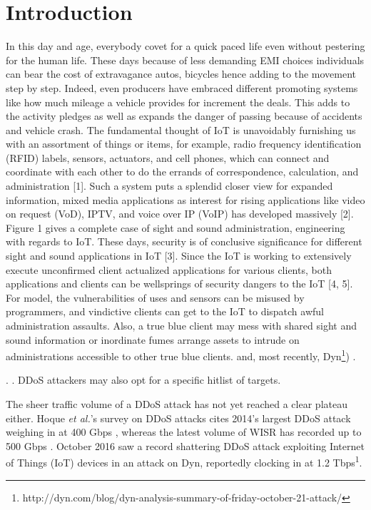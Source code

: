 \documentclass[conference]{IEEEtran}
\begin{document}
\section{Introduction}
In this day and age, everybody covet for a quick paced life even without pestering for the human life. These days because of less demanding EMI choices individuals can bear the cost of extravagance autos, bicycles hence adding to the movement step by step. Indeed, even producers have embraced different promoting systems like how much mileage a vehicle provides for increment the deals. This adds to the activity pledges as well as expands the danger of passing because of accidents and vehicle crash.
The fundamental thought of IoT is unavoidably furnishing us with an assortment of things or items, for example, radio frequency identification (RFID) labels, sensors, actuators, and cell phones, which can connect and coordinate with each other to do the errands of correspondence, calculation, and administration [1]. Such a system puts a splendid closer view for expanded information, mixed media applications as interest for rising applications like video on request (VoD), IPTV, and voice over IP (VoIP) has developed massively [2]. Figure 1 gives a complete case of sight and sound administration, engineering with regards to IoT. These days, security is of conclusive significance for different sight and sound applications in IoT [3]. Since the IoT is working to extensively execute unconfirmed client actualized applications for various clients, both applications and clients can be wellsprings of security dangers to the IoT [4, 5]. For model, the vulnerabilities of uses and sensors can be misused by programmers, and vindictive clients can get to the IoT to dispatch awful administration assaults. Also, a true blue client may mess with shared sight and sound information or inordinate fumes arrange assets to intrude on administrations accessible to other true blue clients.
 \cite{Multimedia:chao} and, most recently, Dyn\footnote{http://dyn.com/blog/dyn-analysis-summary-of-friday-october-21-attack/})  \cite{Arbor:WISR}.

 \cite{DDoS:CERT}.  \cite{Botnet:Hoque}. DDoS attackers may also opt for a specific hitlist of targets.

The sheer traffic volume of a DDoS attack has not yet reached a clear plateau either. Hoque \textit{et al.}'s survey on DDoS attacks cites 2014's largest DDoS attack weighing in at 400 Gbps \cite{Botnet:Hoque}, whereas the latest volume of WISR has recorded up to 500 Gbps \cite{Arbor:WISR}. October 2016 saw a record shattering DDoS attack exploiting Internet of Things (IoT) devices in an attack on Dyn, reportedly clocking in at 1.2 Tbps\textsuperscript{1}.
\end{document}
